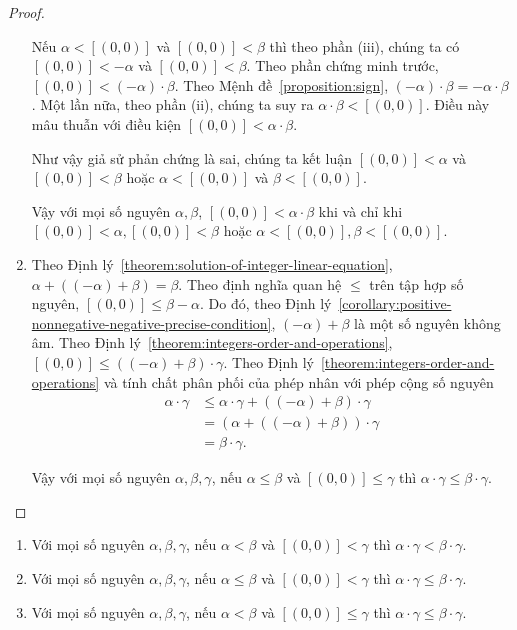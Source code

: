 \begin{proof}
\begin{enumerate}[label={(\roman*)}]
              Nếu $\alpha < [(0,0)]$ và $[(0,0)] < \beta$ thì theo phần (iii), chúng ta có $[(0,0)] < -\alpha$ và $[(0,0)] < \beta$. Theo phần chứng minh trước, $[(0,0)] < (-\alpha)\cdot\beta$. Theo Mệnh đề~\ref{proposition:sign}, $(-\alpha)\cdot\beta = -\alpha\cdot\beta$. Một lần nữa, theo phần (ii), chúng ta suy ra $\alpha\cdot\beta < [(0,0)]$. Điều này mâu thuẫn với điều kiện $[(0,0)] < \alpha\cdot\beta$.

              Như vậy giả sử phản chứng là sai, chúng ta kết luận $[(0,0)] < \alpha$ và $[(0,0)] < \beta$ hoặc $\alpha < [(0,0)]$ và $\beta < [(0,0)]$.

              Vậy với mọi số nguyên $\alpha, \beta$, $[(0,0)] < \alpha\cdot \beta$ khi và chỉ khi $[(0,0)] < \alpha, [(0,0)] < \beta$ hoặc $\alpha < [(0,0)], \beta < [(0,0)]$.
        \item Theo Định lý~\ref{theorem:solution-of-integer-linear-equation}, $\alpha + ((-\alpha) + \beta) = \beta$. Theo định nghĩa quan hệ $\leq$ trên tập hợp số nguyên, $[(0,0)] \leq \beta - \alpha$. Do đó, theo Định lý~\ref{corollary:positive-nonnegative-negative-precise-condition}, $(-\alpha) + \beta$ là một số nguyên không âm. Theo Định lý~\ref{theorem:integers-order-and-operations}, $[(0,0)]\leq ((-\alpha) + \beta)\cdot\gamma$. Theo Định lý~\ref{theorem:integers-order-and-operations} và tính chất phân phối của phép nhân với phép cộng số nguyên
              \begin{align*}
                  \alpha\cdot\gamma & \leq \alpha\cdot\gamma + ((-\alpha) + \beta)\cdot\gamma \\
                                    & = (\alpha + ((-\alpha) + \beta))\cdot\gamma             \\
                                    & = \beta\cdot\gamma.
              \end{align*}

              Vậy với mọi số nguyên $\alpha, \beta, \gamma$, nếu $\alpha\leq\beta$ và $[(0,0)]\leq\gamma$ thì $\alpha\cdot\gamma \leq \beta\cdot\gamma$.
    \end{enumerate}
\end{proof}

\begin{corollary}\label{corollary:integers-order-and-multiplication}
    \begin{enumerate}[label={(\roman*)}]
        \item Với mọi số nguyên $\alpha, \beta, \gamma$, nếu $\alpha < \beta$ và $[(0,0)] < \gamma$ thì $\alpha\cdot\gamma < \beta\cdot\gamma$.
        \item Với mọi số nguyên $\alpha, \beta, \gamma$, nếu $\alpha \leq \beta$ và $[(0,0)] < \gamma$ thì $\alpha\cdot\gamma \leq \beta\cdot\gamma$.
        \item Với mọi số nguyên $\alpha, \beta, \gamma$, nếu $\alpha < \beta$ và $[(0,0)] \leq \gamma$ thì $\alpha\cdot\gamma \leq \beta\cdot\gamma$.
    \end{enumerate}
\end{corollary}

